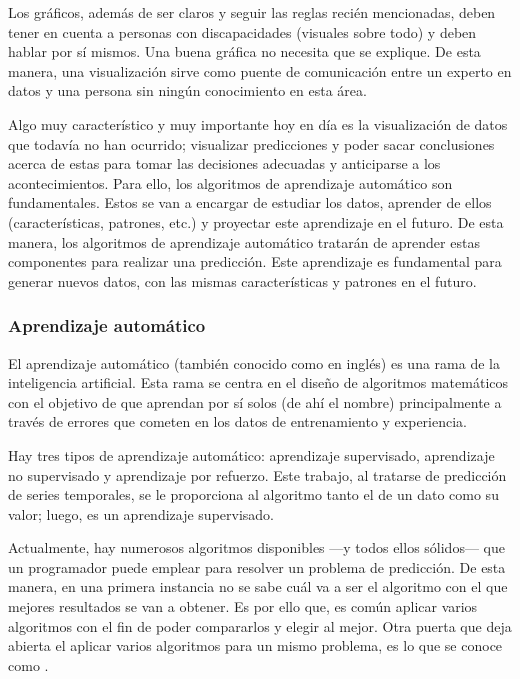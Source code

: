 {Los gráficos, además de ser claros y seguir las reglas recién mencionadas, deben tener en cuenta a personas con discapacidades (visuales sobre todo) y deben hablar por sí mismos. Una buena gráfica no necesita que se explique. De esta manera, una visualización sirve como puente de comunicación entre un experto en datos y una persona sin ningún conocimiento en esta área. 

Algo muy característico y muy importante hoy en día es la visualización de datos que todavía no han ocurrido; visualizar predicciones y poder sacar conclusiones acerca de estas para tomar las decisiones adecuadas y anticiparse a los acontecimientos. Para ello, los algoritmos de aprendizaje automático son fundamentales. Estos se van a encargar de estudiar los datos, aprender de ellos (características, patrones, etc.) y proyectar este aprendizaje en el futuro. De esta manera, los algoritmos de aprendizaje automático tratarán de aprender estas componentes para realizar una predicción. Este aprendizaje es fundamental para generar nuevos datos, con las mismas características y patrones en el futuro.


\subsubsection{Aprendizaje automático}

El aprendizaje automático (también conocido como  en inglés) es una rama de la inteligencia artificial. Esta rama se centra en el diseño de algoritmos matemáticos con el objetivo de que aprendan por sí solos (de ahí el nombre) principalmente a través de errores que cometen en los datos de entrenamiento y experiencia.

Hay tres tipos de aprendizaje automático: aprendizaje supervisado, aprendizaje no supervisado y aprendizaje por refuerzo. Este trabajo, al tratarse de predicción de series temporales, se le proporciona al algoritmo tanto el  de un dato como su valor; luego, es un aprendizaje supervisado.

Actualmente, hay numerosos algoritmos disponibles ---y todos ellos sólidos--- que un programador puede emplear para resolver un problema de predicción. De esta manera, en una primera instancia no se sabe cuál va a ser el algoritmo con el que mejores resultados se van a obtener. Es por ello que, es común aplicar varios algoritmos con el fin de poder compararlos y elegir al mejor. Otra puerta que deja abierta el aplicar varios algoritmos para un mismo problema, es lo que se conoce como \fnm.


}
